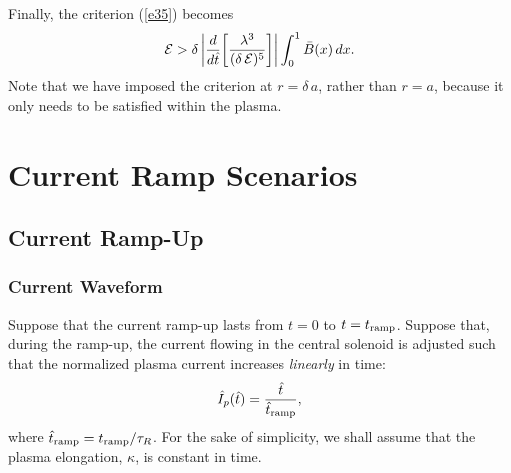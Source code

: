 \documentclass{iopjournal}
\begin{document}
Finally, the criterion (\ref{e35}) becomes 
\begin{equation}\label{e55}
{\cal E}> \delta\left|\frac{d}{d\hat{t}}\!\left[\frac{\lambda^3}{(\delta\,{\cal E})^5}\right]\right|\int_0^1\bar{B}(x)\,dx.
\end{equation}
Note that we have imposed the criterion at $r=\delta\,a$, rather than $r=a$, because it only needs to be satisfied
within the plasma. 

\section{Current Ramp Scenarios}
\subsection{Current Ramp-Up}
\subsubsection{Current Waveform}
Suppose that the current ramp-up lasts from $t=0$ to $t=t_{\rm ramp}$. Suppose that, during the ramp-up, the current flowing in the central solenoid is adjusted such that
the normalized plasma current increases {\em linearly}\/ in time:
\begin{equation}\label{e56}
\hat{I}_p(\hat{t}) = \frac{\hat{t}}{\hat{t}_{\rm ramp}},
\end{equation}
where $\hat{t}_{\rm ramp} =t_{\rm ramp}/\tau_R$. For the sake of simplicity, we shall assume that the plasma elongation, $\kappa$,  is constant in time. 
\end{document}
